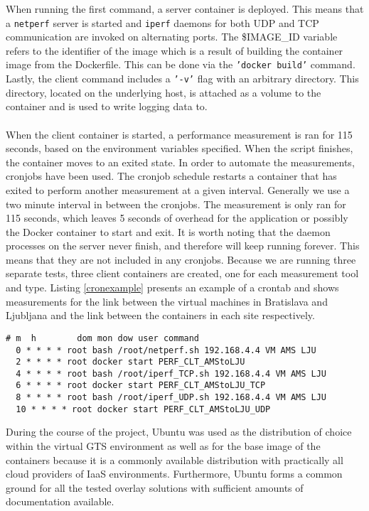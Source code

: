 When running the first command, a server container is deployed. This means that a \texttt{netperf} server is started and \texttt{iperf} daemons for both UDP and TCP communication are invoked on alternating ports. The \$IMAGE\_ID variable refers to the identifier of the image which is a result of building the container image from the Dockerfile. This can be done via the \texttt{'docker build'} command. Lastly, the client command includes a \texttt{'-v'} flag with an arbitrary directory. This directory, located on the underlying host, is attached as a volume to the container and is used to write logging data to.
\\\\
When the client container is started, a performance measurement is ran for 115 seconds, based on the environment variables specified. When the script finishes, the container moves to an exited state. In order to automate the measurements, cronjobs have been used. The cronjob schedule restarts a container that has exited to perform another measurement at a given interval. Generally we use a two minute interval in between the cronjobs. The measurement is only ran for 115 seconds, which leaves 5 seconds of overhead for the application or possibly the Docker container to start and exit. It is worth noting that the daemon processes on the server never finish, and therefore will keep running forever. This means that they are not included in any cronjobs. Because we are running three separate tests, three client containers are created, one for each measurement tool and type. Listing \ref{cronexample} presents an example of a crontab and shows measurements for the link between the virtual machines in Bratislava and Ljubljana and the link between the containers in each site respectively.  
\\
\begin{lstlisting}[caption={Crontab example for the point-to-point link between AMS and LJU},label=cronexample]
# m  h        dom mon dow user command
  0 * * * * root bash /root/netperf.sh 192.168.4.4 VM AMS LJU
  2 * * * * root docker start PERF_CLT_AMStoLJU
  4 * * * * root bash /root/iperf_TCP.sh 192.168.4.4 VM AMS LJU
  6 * * * * root docker start PERF_CLT_AMStoLJU_TCP
  8 * * * * root bash /root/iperf_UDP.sh 192.168.4.4 VM AMS LJU
  10 * * * * root docker start PERF_CLT_AMStoLJU_UDP
\end{lstlisting}

During the course of the project, Ubuntu was used as the distribution of choice within the virtual GTS environment as well as for the base image of the containers because it is a commonly available distribution with practically all cloud providers of IaaS environments. Furthermore, Ubuntu forms a common ground for all the tested overlay solutions with sufficient amounts of documentation available.

